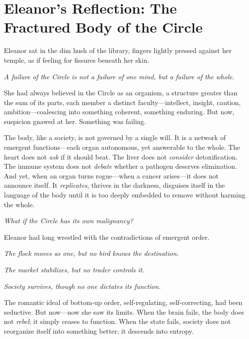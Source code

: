 
\section*{Eleanor's Reflection: The Fractured Body of the Circle}

Eleanor sat in the dim hush of the library, fingers lightly pressed against her temple, as if feeling for fissures beneath her skin.  

\smallskip

\textit{A failure of the Circle is not a failure of one mind, but a failure of the whole.}  

\smallskip

She had always believed in the Circle as an organism, a structure greater than the sum of its parts, each member a distinct faculty—intellect, insight, caution, ambition—coalescing into something coherent, something enduring. But now, suspicion gnawed at her.  Something was failing.  

\smallskip

The body, like a society, is not governed by a single will. It is a network of emergent functions—each organ autonomous, yet answerable to the whole. The heart does not \textit{ask} if it should beat. The liver does not \textit{consider} detoxification. The immune system does not \textit{debate} whether a pathogen deserves elimination. And yet, when an organ turns rogue—when a cancer arises—it does not announce itself. It \textit{replicates}, thrives in the darkness, disguises itself in the language of the body until it is too deeply embedded to remove without harming the whole.  

\smallskip

\textit{What if the Circle has its own malignancy?}  

\smallskip

Eleanor had long wrestled with the contradictions of emergent order.  

\smallskip

\textit{The flock moves as one, but no bird knows the destination.}

\textit{The market stabilizes, but no trader controls it.}  

\textit{Society survives, though no one dictates its function.}  

\smallskip

The romantic ideal of bottom-up order, self-regulating, self-correcting, had been seductive. But now—now she saw its limits. When the brain fails, the body does not \textit{rebel}; it simply ceases to function.  When the state fails, society does not reorganize itself into something better; it descends into entropy.  

